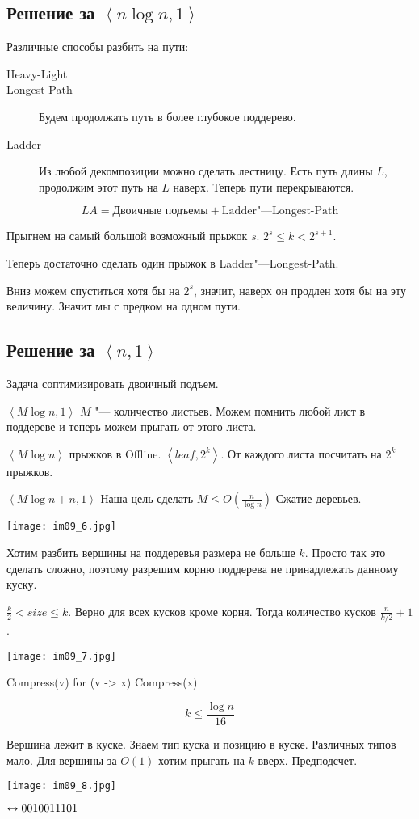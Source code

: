 \subsection{Решение за \texorpdfstring{$\left<n\log n, 1\right>$}{<n log n, 1>}}

Различные способы разбить на пути:
\begin{description}
	\item[Heavy-Light]
	\item[Longest-Path] Будем продолжать путь в более глубокое поддерево.
	\item[Ladder] Из любой декомпозиции можно сделать лестницу. Есть путь длины $L$, продолжим этот путь на $L$ наверх. Теперь пути перекрываются.
\end{description}

\[ LA = \text{Двоичные подъемы} + \text{Ladder"---Longest-Path} \]

Прыгнем на самый большой возможный прыжок $s$. $2^s \le k < 2^{s + 1}$.

Теперь достаточно сделать один прыжок в Ladder"---Longest-Path.

Вниз можем спуститься хотя бы на $2^s$, значит, наверх он продлен хотя бы на эту величину.
Значит мы с предком на одном пути.

\subsection{Решение за \texorpdfstring{$\left<n, 1\right>$}{<n, 1>}}
Задача  соптимизировать двоичный подъем.

$\left<M\log n, 1\right>$
$M$ "--- количество листьев. Можем помнить любой лист в поддереве и теперь можем прыгать от этого листа.

$\left<M\log n\right>$ прыжков в Offline. $\left<leaf, 2^k\right>$. От каждого листа посчитать на $2^k$ прыжков.

$\left<M\log n + n, 1\right>$
Наша цель сделать $M \le O(\frac{n}{\log n})$
Сжатие деревьев.

\begin{center}
\texttt{[image: im09\_6.jpg]}
\end{center}

Хотим разбить вершины на поддеревья размера не больше $k$.
Просто так это сделать сложно, поэтому разрешим корню поддерева не принадлежать данному куску.

$\frac{k}{2} < size \le k$. Верно для всех кусков кроме корня.
Тогда количество кусков $\frac{n}{k/2} + 1$.

\begin{center}
\texttt{[image: im09\_7.jpg]}
\end{center}

\begin{cppcode}
Compress(v) {
    for (v -> x) Compress(x)
}
\end{cppcode}

\[ k \le \frac{\log n}{16} \]

Вершина лежит в куске.
Знаем тип куска и позицию в куске.
Различных типов мало.
Для вершины за $O(1)$ хотим прыгать на $k$ вверх.
Предподсчет.

\texttt{[image: im09\_8.jpg]}

$\leftrightarrow 0010011101$
